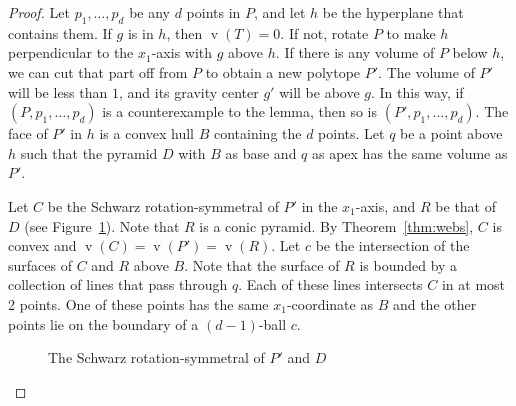 \documentclass{cccg10}
\DeclareMathOperator{\vol}{v}
\begin{document}
\begin{proof}
Let $p_1,\ldots,p_d$ be any $d$ points in $P$, and let $h$ be the
hyperplane that contains them. If $g$ is in $h$, then $\vol(T) = 0$. If
not, rotate $P$ to make $h$ perpendicular to the $x_{1}$-axis with $g$
above $h$. If there is any volume of $P$ below $h$, we can cut that part
off from $P$ to obtain a new polytope $P'$.  The volume of $P'$ will be
less than $1$, and its gravity center $g'$ will be above $g$.  In this
way, if $(P,p_1,\ldots,p_d)$ is a counterexample to the lemma, then so
is $(P',p_1,\ldots,p_d)$. The face of $P'$ in $h$ is a convex hull $B$
containing the $d$ points. Let $q$ be a point above $h$ such that the
pyramid $D$ with $B$ as base and $q$ as apex has the same volume as $P'$.

Let $C$ be the Schwarz rotation-symmetral of $P'$ in the $x_{1}$-axis,
and $R$ be that of $D$ (see Figure~\ref{fig:rotsym}). Note that $R$ is a
conic pyramid.  By Theorem~\ref{thm:webs}, $C$ is convex and $\vol(C) =
\vol(P') = \vol(R)$. Let $c$ be the intersection of the surfaces of $C$
and $R$ above $B$. Note that the surface of $R$ is bounded by a collection
of lines that pass through $q$.  Each of these lines intersects $C$ in at
most 2 points.  One of these points has the same $x_1$-coordinate as $B$
and the other points lie on the boundary of a $(d-1)$-ball $c$.
\begin{figure}[ht]
  \centering
  \hspace{10mm}
  \caption{The Schwarz rotation-symmetral of $P'$ and $D$}
  \label{fig:rotsym}
\end{figure}


\end{proof}
\end{document}
